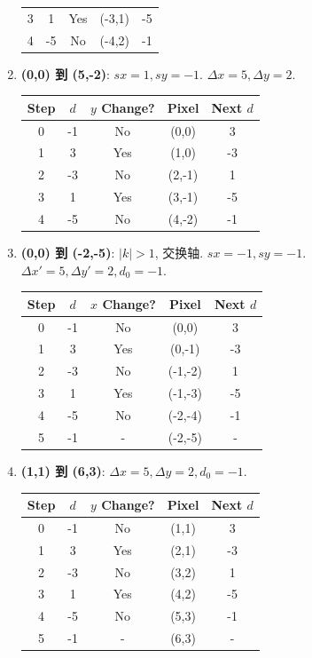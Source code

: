 \documentclass[UTF8]{ctexart}
\begin{document}
\begin{enumerate}
\begin{center}
\begin{tabular}{ccccc}
    3 & 1 & Yes & (-3,1) & -5 \\ 4 & -5 & No & (-4,2) & -1 \\ \bottomrule
    \end{tabular}
    \end{center}
    \item \textbf{(0,0) 到 (5,-2)}: $sx=1, sy=-1$. $\Delta x=5, \Delta y=2$.
    \begin{center}
    \begin{tabular}{ccccc}
    \toprule Step & $d$ & $y$ Change? & Pixel & Next $d$ \\ \midrule
    0 & -1 & No & (0,0) & 3 \\
    1 & 3 & Yes & (1,0) & -3 \\ 2 & -3 & No & (2,-1) & 1 \\
    3 & 1 & Yes & (3,-1) & -5 \\ 4 & -5 & No & (4,-2) & -1 \\ \bottomrule
    \end{tabular}
    \end{center}
    
    \item \textbf{(0,0) 到 (-2,-5)}: $|k|>1$, 交换轴. $sx=-1, sy=-1$. $\Delta x'=5, \Delta y'=2, d_0=-1$.
    \begin{center}
    \begin{tabular}{ccccc}
    \toprule Step & $d$ & $x$ Change? & Pixel & Next $d$ \\ \midrule
    0 & -1 & No & (0,0) & 3 \\
    1 & 3 & Yes & (0,-1) & -3 \\ 2 & -3 & No & (-1,-2) & 1 \\
    3 & 1 & Yes & (-1,-3) & -5 \\ 4 & -5 & No & (-2,-4) & -1 \\
    5 & -1 & - & (-2,-5) & - \\ \bottomrule
    \end{tabular}
    \end{center}
    
    \item \textbf{(1,1) 到 (6,3)}: $\Delta x=5, \Delta y=2, d_0=-1$.
    \begin{center}
    \begin{tabular}{ccccc}
    \toprule Step & $d$ & $y$ Change? & Pixel & Next $d$ \\ \midrule
    0 & -1 & No & (1,1) & 3 \\
    1 & 3 & Yes & (2,1) & -3 \\ 2 & -3 & No & (3,2) & 1 \\
    3 & 1 & Yes & (4,2) & -5 \\ 4 & -5 & No & (5,3) & -1 \\
    5 & -1 & - & (6,3) & - \\ \bottomrule
    \end{tabular}
    \end{center}
    

\end{enumerate}
\end{document}

